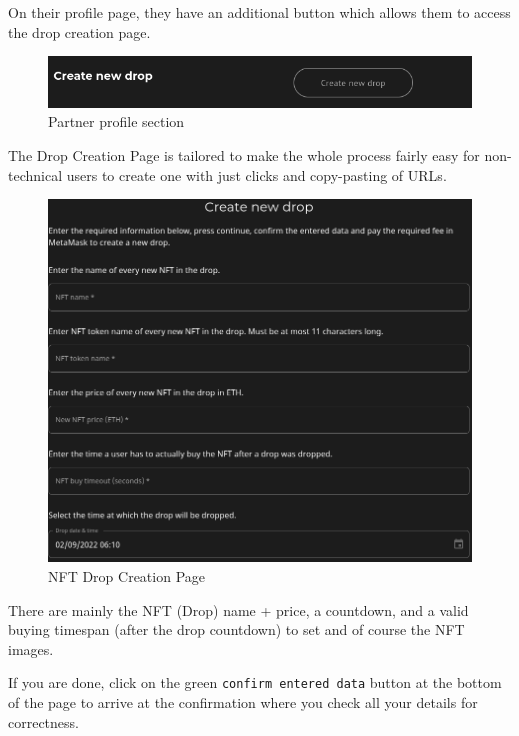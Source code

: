 \documentclass[
]{article}
\begin{document}
On their profile page, they have an additional button which allows them
to access the drop creation page.

\begin{figure}
\centering
\includegraphics{images/profile_partner_section.png}
\caption{Partner profile section}
\end{figure}\newpage

The Drop Creation Page is tailored to make the whole process fairly easy
for non-technical users to create one with just clicks and copy-pasting
of URLs.

\begin{figure}
\centering
\includegraphics{images/nft_drop_creation_page.png}
\caption{NFT Drop Creation Page}
\end{figure}\newpage

There are mainly the NFT (Drop) name + price, a countdown, and a valid
buying timespan (after the drop countdown) to set and of course the NFT
images.

If you are done, click on the green \texttt{confirm\ entered\ data}
button at the bottom of the page to arrive at the confirmation where you
check all your details for correctness.
\end{document}
